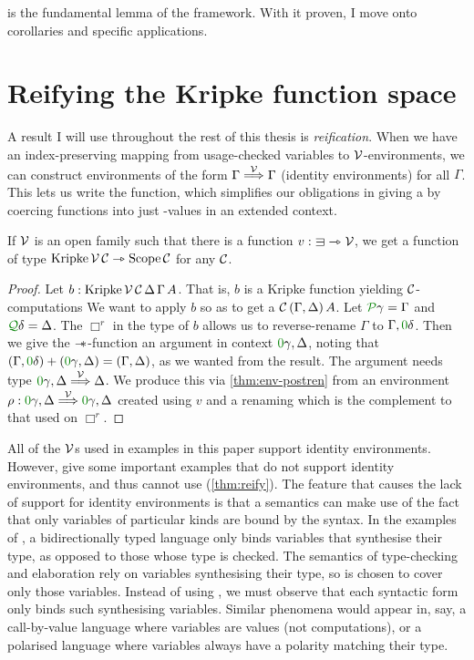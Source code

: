  is the fundamental lemma of the framework.
With it proven, I move onto corollaries and specific applications.

\section{Reifying the Kripke function space}\label{sec:reify}

A result I will use throughout the rest of this thesis is \emph{reification}.
When we have an index-preserving mapping from usage-checked variables to
$\V$-environments, we can construct environments of the form
$\Gamma \stackrel{\mathcal V}\Longrightarrow \Gamma$ (identity environments) for all $\Gamma$.
This lets us write the  function, which  simplifies our
obligations in giving a  by coercing
 functions into just
\AgdaBound{$\C$}-values in an extended context.

\begin{lemma}\label{thm:reify}
  If $\V$ is an open family such that there is a function
  $v : {\sqni} \rightarrowtriangle \V$, we get a function of type
  $\mathrm{Kripke}\,\mathcal V\,\mathcal C \rightarrowtriangle \mathrm{Scope}\,\mathcal C$ for any $\C$.
\end{lemma}
\begin{proof}
  Let $b : \mathrm{Kripke}\,\mathcal V\,\mathcal C\,\Delta\,\Gamma\,A$.
  That is, $b$ is a Kripke function yielding $\C$-computations
  We want to apply $b$ so as to get a $\C\,\plr{\Gamma, \Delta}\,A$.
  Let $\grP\gamma = \Gamma$ and $\grQ\delta = \Delta$.
  The $\Box^r$ in the type of $b$ allows us to reverse-rename $\Gamma$ to
  $\Gamma, \gr0\delta$.
  Then we give the $\mathrel{\mathord{-}\hspace{-0.75ex}*}$-function an argument in context
  $\gr0\gamma, \Delta$, noting that
  $\plr{\Gamma, \gr0\delta} + \plr{\gr0\gamma, \Delta} = \plr{\Gamma, \Delta}$,
  as we wanted from the result.
  The argument needs type $\gr0\gamma, \Delta \env\V \Delta$.
  We produce this via \cref{thm:env-postren} from an environment
  $\rho : \gr0\gamma, \Delta \env\V \gr0\gamma, \Delta$ created using $v$
  and a renaming which is the complement to that used on $\Box^r$.
\end{proof}

All of the $\V$s used in examples in this paper support identity environments.
However, \citet[p.~27]{AACMM21} give some important examples that do not
support identity environments, and thus cannot use 
(\cref{thm:reify}).
The feature that causes the lack of support for identity environments is that
a semantics can make use of the fact that only variables of particular kinds
are bound by the syntax.
In the examples of \citeauthor{AACMM21}, a bidirectionally typed language only
binds variables that synthesise their type, as opposed to those whose type is
checked.
The semantics of type-checking and elaboration rely on variables synthesising
their type, so \AgdaBound{$\V$} is chosen to cover only those variables.
Instead of using , we must observe that each syntactic form
only binds such synthesising variables.
Similar phenomena would appear in, say, a call-by-value language where
variables are values (not computations), or a polarised language where
variables always have a polarity matching their type.

